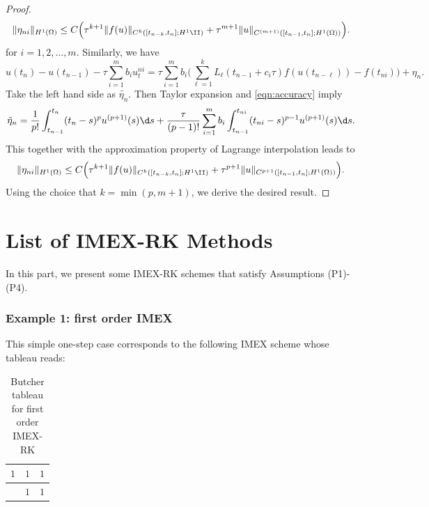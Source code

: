 \begin{proof}
\begin{equation*}
    \|\eta_{ni}\|_{H^1(\Omega)} \leq C\Big(\tau^{k+1} \| f(u)  \|_{C^{k}([t_{n-k},t_n]; H^1\II)}
    + \tau^{m+1} \|u\|_{C^{(m+1)}([t_{n-1},t_n];H^1(\Omega))} \Big). %
\end{equation*}
for $i=1,2,\dots,m$. Similarly, we have
\begin{equation*}
    u(t_{n}) -  u(t_{n-1}) -\tau\sum_{i=1}^m b_i  u_t^{ni} =
    \tau \sum_{i=1}^m b_i  \Big(\sum_{\ell=1}^k L_{\ell}(t_{n-1}+c_i\tau) f(u(t_{n-\ell})) - f(t_{ni})\Big)  +
    \eta_{n}.
\end{equation*}
Take the left hand side as $\tilde{\eta_n}$. Then Taylor expansion and \eqref{eqn:accuracy} imply
\begin{equation*}
\begin{aligned}
\tilde\eta_{n} =\frac1{p!}\int_{t_{n-1}}^{t_n} (t_n-s)^p u^{(p+1)}(s) \d s
+ \frac\tau{(p-1)!}\sum_{i=1}^mb_i\int_{t_{n-1}}^{t_{ni}}
(t_{ni}-s)^{p-1} u^{(p+1)}(s) \d s.
\end{aligned}
\end{equation*}
This together with the approximation property of Lagrange interpolation leads to
\begin{equation*}
     \|\eta_{ni}\|_{H^1(\Omega)} \leq C\Big(\tau^{k+1} \| f(u)  \|_{C^{k}([t_{n-k},t_n]; H^1\II)}
    + \tau^{p+1} \|u \|_{C^{p+1}([t_{n-1},t_n];H^1(\Omega))} \Big).
\end{equation*}
Using the choice that $k=\min(p, m+1)$, we derive the desired result.
\end{proof}



\section{List of IMEX-RK Methods}
In this part, we present some IMEX-RK schemes that satisfy
Assumptions (P1)-(P4).

\subsubsection{Example 1: first order IMEX}
This simple one-step case corresponds to the following IMEX scheme whose tableau reads:
\begin{table}[h]
    \centering
    \begin{tabular}[h]{c|c|c}
        $1$ & $1$ & $1$\\
        \hline
        ~ & $1$ & $1$
    \end{tabular}
    \caption{Butcher tableau for first order IMEX-RK}
\end{table}

